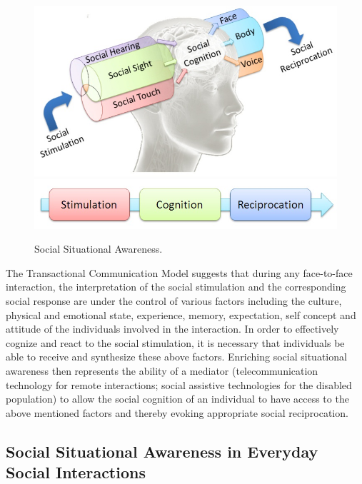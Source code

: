 \documentclass[oneside,11pt]{memoir}
\begin{document}
\begin{figure}[h]
\begin{center}
 \includegraphics[width=4.5in]{SSA.jpg}
 \includegraphics[width=4.5in]{SSA2.jpg}
\caption{Social Situational Awareness.}
\label{Fig:Figure3}
\end{center}
\end{figure}

The Transactional Communication Model \cite{sameroff_reproductive_1975} suggests that during any face-to-face interaction, the interpretation of the social stimulation and the corresponding social response are under the control of various factors including the culture, physical and emotional state, experience, memory, expectation, self concept and attitude of the individuals involved in the interaction. In order to effectively cognize and react to the social stimulation, it is necessary that individuals be able to receive and synthesize these above factors. Enriching social situational awareness then represents the ability of a mediator (telecommunication technology for remote interactions; social assistive technologies for the disabled population) to allow the social cognition of an individual to have access to the above mentioned factors and thereby evoking appropriate social reciprocation.

\subsection{Social Situational Awareness in Everyday Social Interactions}
\end{document}

